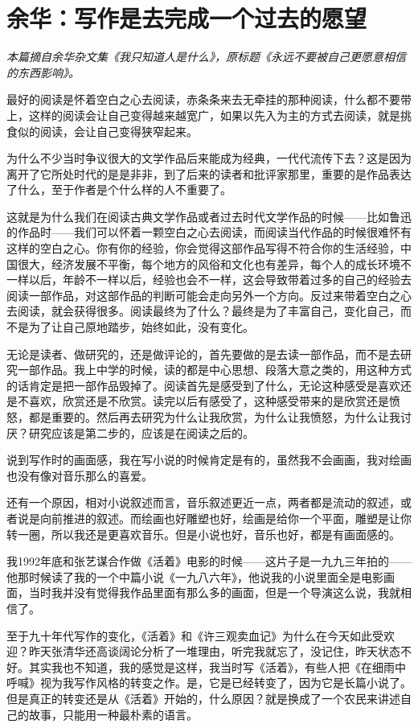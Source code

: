 \documentclass[12pt,a5paper]{ctexbook}
\begin{document}
\newpage
\section{余华：写作是去完成一个过去的愿望}

\emph{本篇摘自余华杂文集《我只知道人是什么》，原标题《永远不要被自己更愿意相信的东西影响》。}
\vspace{2em}

最好的阅读是怀着空白之心去阅读，赤条条来去无牵挂的那种阅读，什么都不要带上，这样的阅读会让自己变得越来越宽广，如果以先入为主的方式去阅读，就是挑食似的阅读，会让自己变得狭窄起来。

为什么不少当时争议很大的文学作品后来能成为经典，一代代流传下去？这是因为离开了它所处时代的是是非非，到了后来的读者和批评家那里，重要的是作品表达了什么，至于作者是个什么样的人不重要了。

这就是为什么我们在阅读古典文学作品或者过去时代文学作品的时候——比如鲁迅的作品时——我们可以怀着一颗空白之心去阅读，而阅读当代作品的时候很难怀有这样的空白之心。你有你的经验，你会觉得这部作品写得不符合你的生活经验，中国很大，经济发展不平衡，每个地方的风俗和文化也有差异，每个人的成长环境不一样以后，年龄不一样以后，经验也会不一样，这会导致带着过多的自己的经验去阅读一部作品，对这部作品的判断可能会走向另外一个方向。反过来带着空白之心去阅读，就会获得很多。阅读最终为了什么？最终是为了丰富自己，变化自己，而不是为了让自己原地踏步，始终如此，没有变化。

无论是读者、做研究的，还是做评论的，首先要做的是去读一部作品，而不是去研究一部作品。我上中学的时候，读的都是中心思想、段落大意之类的，用这种方式的话肯定是把一部作品毁掉了。阅读首先是感受到了什么，无论这种感受是喜欢还是不喜欢，欣赏还是不欣赏。读完以后有感受了，这种感受带来的是欣赏还是愤怒，都是重要的。然后再去研究为什么让我欣赏，为什么让我愤怒，为什么让我讨厌？研究应该是第二步的，应该是在阅读之后的。

说到写作时的画面感，我在写小说的时候肯定是有的，虽然我不会画画，我对绘画也没有像对音乐那么的喜爱。

还有一个原因，相对小说叙述而言，音乐叙述更近一点，两者都是流动的叙述，或者说是向前推进的叙述。而绘画也好雕塑也好，绘画是给你一个平面，雕塑是让你转一圈，所以我还是更喜欢音乐。但是小说也好，音乐也好，都是有画面感的。

我1992年底和张艺谋合作做《活着》电影的时候——这片子是一九九三年拍的——他那时候读了我的一个中篇小说《一九八六年》，他说我的小说里面全是电影画面，当时我并没有觉得我作品里面有那么多的画面，但是一个导演这么说，我就相信了。

至于九十年代写作的变化，《活着》和《许三观卖血记》为什么在今天如此受欢迎？昨天张清华还高谈阔论分析了一堆理由，听完我就忘了，没记住，昨天状态不好。其实我也不知道，我的感觉是这样，我当时写《活着》，有些人把《在细雨中呼喊》视为我写作风格的转变之作。是，它是已经转变了，因为它是长篇小说了。但是真正的转变还是从《活着》开始的，什么原因？就是换成了一个农民来讲述自己的故事，只能用一种最朴素的语言。
\end{document}
